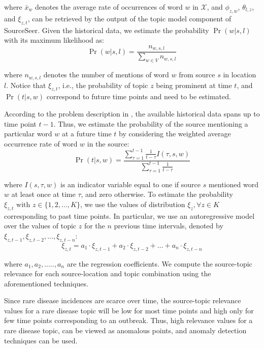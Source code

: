 \documentclass[twoside,leqno,twocolumn]{article}
\newcommand{\fullmodel}{{{\sf SourceSeer}}\xspace}
\begin{document}
\noindent where $\bar{x}_{w}$ denotes the average rate of occurrences of word $w$ in $\mathcal{X}$,  and 
$\phi_{z,w}$, $\theta_{l,z}$, and $\xi_{z,t}$, can be retrieved by the output of the topic model component of \fullmodel.  Given the historical data, we estimate the probability $\Pr(w|s,l)$ with its maximum likelihood as:
{\small \begin{equation}
  \Pr(w|s,l) = \frac{n_{w,s,l}}{\sum_{w\in V}n_{w,s,l}}
\end{equation}}
\vspace{-10pt}

\noindent where $n_{w,s,l}$ denotes the number of mentions of word $w$ from source $s$ in location $l$.
Notice that $\xi_{z,t}$, i.e., the probability of topic $z$ being prominent at time $t$, 
and $\Pr(t|s,w)$ correspond to future time points and need to be estimated.  

According to the problem description in , the available historical 
data spans up to time point $t-1$. Thus, we estimate the probability of the source 
mentioning a particular word $w$ at a future time $t$ by considering the weighted average occurrence rate of word $w$ in the source:
{\small \begin{equation}
\Pr(t|s,w) = \frac{\sum_{\tau = 1}^{t-1} \frac{1}{t - \tau}I(\tau,s,w)}{\sum_{\tau = 1}^{t-1} \frac{1}{t - \tau}}
\label{eq:prob_time}
\end{equation}}
\vspace{-10pt}

\noindent where $I(s,\tau,w)$ is an indicator variable equal to one if source $s$ mentioned word $w$ at least once at time $\tau$, and zero otherwise. 
To estimate the probability $\xi_{z,t} \mbox{ with } z \in \{1, 2, \dots, K\}$, 
we use the values of distribution $\xi_{z}, \forall z \in K$ corresponding to past time points. In particular, we use an autoregressive model over the values of topic $z$ for the $n$ previous time intervals, denoted by $\xi_{z,t-1},\xi_{z,t-2},\dots,\xi_{z,t-n}$:
{\small \begin{equation}
\xi_{z,t}=a_1 \cdot \xi_{z,t-1}+a_2\cdot \xi_{z,t-2}+\dots +a_n\cdot \xi_{z,t-n}
\end{equation}}
\vspace{-10pt}

\noindent where $a_1,a_2,.....,a_n$ are the regression coefficients. We compute the source-topic relevance for each source-location and topic combination using the aforementioned techniques.

Since rare disease incidences are scarce over time, the source-topic relevance values for a rare disease topic will be low for most time points and high only for few time points corresponding to an outbreak. Thus, high relevance values for a rare disease topic, can be viewed as anomalous points, and anomaly detection techniques can be used.
\end{document}
